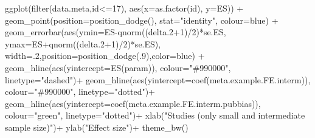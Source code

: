 \documentclass[
]{book}
\newenvironment{Shaded}{\begin{snugshade}}{\end{snugshade}}
\newcommand{\AttributeTok}[1]{\textcolor[rgb]{0.77,0.63,0.00}{#1}}
\newcommand{\DecValTok}[1]{\textcolor[rgb]{0.00,0.00,0.81}{#1}}
\newcommand{\FloatTok}[1]{\textcolor[rgb]{0.00,0.00,0.81}{#1}}
\newcommand{\FunctionTok}[1]{\textcolor[rgb]{0.00,0.00,0.00}{#1}}
\newcommand{\NormalTok}[1]{#1}
\newcommand{\SpecialCharTok}[1]{\textcolor[rgb]{0.00,0.00,0.00}{#1}}
\newcommand{\StringTok}[1]{\textcolor[rgb]{0.31,0.60,0.02}{#1}}
\theoremstyle{definition}
\theoremstyle{definition}
\theoremstyle{definition}
\theoremstyle{definition}
\theoremstyle{remark}
\begin{document}
\begin{Shaded}
\begin{Highlighting}[]
  \FunctionTok{ggplot}\NormalTok{(}\FunctionTok{filter}\NormalTok{(data.meta,id}\SpecialCharTok{\textless{}=}\DecValTok{17}\NormalTok{), }\FunctionTok{aes}\NormalTok{(}\AttributeTok{x=}\FunctionTok{as.factor}\NormalTok{(id), }\AttributeTok{y=}\NormalTok{ES)) }\SpecialCharTok{+}
      \FunctionTok{geom\_point}\NormalTok{(}\AttributeTok{position=}\FunctionTok{position\_dodge}\NormalTok{(), }\AttributeTok{stat=}\StringTok{"identity"}\NormalTok{, }\AttributeTok{colour=}\StringTok{\textquotesingle{}blue\textquotesingle{}}\NormalTok{) }\SpecialCharTok{+}
      \FunctionTok{geom\_errorbar}\NormalTok{(}\FunctionTok{aes}\NormalTok{(}\AttributeTok{ymin=}\NormalTok{ES}\SpecialCharTok{{-}}\FunctionTok{qnorm}\NormalTok{((delta}\FloatTok{.2}\SpecialCharTok{+}\DecValTok{1}\NormalTok{)}\SpecialCharTok{/}\DecValTok{2}\NormalTok{)}\SpecialCharTok{*}\NormalTok{se.ES, }\AttributeTok{ymax=}\NormalTok{ES}\SpecialCharTok{+}\FunctionTok{qnorm}\NormalTok{((delta}\FloatTok{.2}\SpecialCharTok{+}\DecValTok{1}\NormalTok{)}\SpecialCharTok{/}\DecValTok{2}\NormalTok{)}\SpecialCharTok{*}\NormalTok{se.ES), }\AttributeTok{width=}\NormalTok{.}\DecValTok{2}\NormalTok{,}\AttributeTok{position=}\FunctionTok{position\_dodge}\NormalTok{(.}\DecValTok{9}\NormalTok{),}\AttributeTok{color=}\StringTok{\textquotesingle{}blue\textquotesingle{}}\NormalTok{) }\SpecialCharTok{+}
      \FunctionTok{geom\_hline}\NormalTok{(}\FunctionTok{aes}\NormalTok{(}\AttributeTok{yintercept=}\FunctionTok{ES}\NormalTok{(param)), }\AttributeTok{colour=}\StringTok{"\#990000"}\NormalTok{, }\AttributeTok{linetype=}\StringTok{"dashed"}\NormalTok{)}\SpecialCharTok{+}
      \FunctionTok{geom\_hline}\NormalTok{(}\FunctionTok{aes}\NormalTok{(}\AttributeTok{yintercept=}\FunctionTok{coef}\NormalTok{(meta.example.FE.interm)), }\AttributeTok{colour=}\StringTok{"\#990000"}\NormalTok{, }\AttributeTok{linetype=}\StringTok{"dotted"}\NormalTok{)}\SpecialCharTok{+}
      \FunctionTok{geom\_hline}\NormalTok{(}\FunctionTok{aes}\NormalTok{(}\AttributeTok{yintercept=}\FunctionTok{coef}\NormalTok{(meta.example.FE.interm.pubbias)), }\AttributeTok{colour=}\StringTok{"green"}\NormalTok{, }\AttributeTok{linetype=}\StringTok{"dotted"}\NormalTok{)}\SpecialCharTok{+}
      \FunctionTok{xlab}\NormalTok{(}\StringTok{"Studies (only small and intermediate sample size)"}\NormalTok{)}\SpecialCharTok{+}
      \FunctionTok{ylab}\NormalTok{(}\StringTok{"Effect size"}\NormalTok{)}\SpecialCharTok{+}
      \FunctionTok{theme\_bw}\NormalTok{()}


\end{Highlighting}
\end{Shaded}
\end{document}
